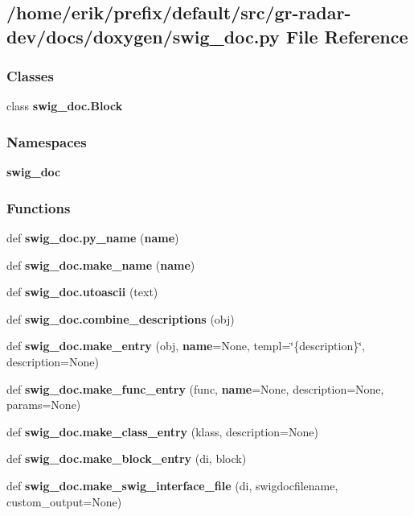 \subsection{/home/erik/prefix/default/src/gr-\/radar-\/dev/docs/doxygen/swig\+\_\+doc.py File Reference}
\label{swig__doc_8py}
\subsubsection*{Classes}
\begin{DoxyCompactItemize}
\item 
class {\bf swig\+\_\+doc.\+Block}
\end{DoxyCompactItemize}
\subsubsection*{Namespaces}
\begin{DoxyCompactItemize}
\item 
 {\bf swig\+\_\+doc}
\end{DoxyCompactItemize}
\subsubsection*{Functions}
\begin{DoxyCompactItemize}
\item 
def {\bf swig\+\_\+doc.\+py\+\_\+name} ({\bf name})
\item 
def {\bf swig\+\_\+doc.\+make\+\_\+name} ({\bf name})
\item 
def {\bf swig\+\_\+doc.\+utoascii} (text)
\item 
def {\bf swig\+\_\+doc.\+combine\+\_\+descriptions} (obj)
\item 
def {\bf swig\+\_\+doc.\+make\+\_\+entry} (obj, {\bf name}=None, templ=\char`\"{}\{description\}\char`\"{}, description=None)
\item 
def {\bf swig\+\_\+doc.\+make\+\_\+func\+\_\+entry} (func, {\bf name}=None, description=None, params=None)
\item 
def {\bf swig\+\_\+doc.\+make\+\_\+class\+\_\+entry} (klass, description=None)
\item 
def {\bf swig\+\_\+doc.\+make\+\_\+block\+\_\+entry} (di, block)
\item 
def {\bf swig\+\_\+doc.\+make\+\_\+swig\+\_\+interface\+\_\+file} (di, swigdocfilename, custom\+\_\+output=None)
\end{DoxyCompactItemize}
